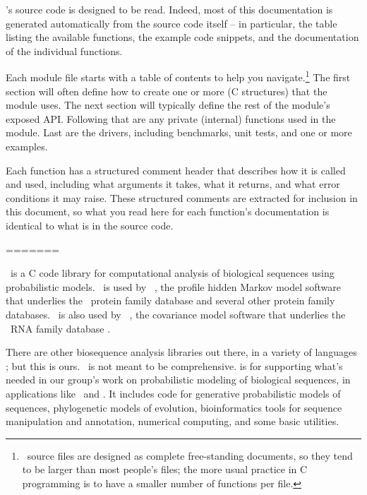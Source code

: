 \Easel's source code is designed to be read. Indeed, most of this
documentation is generated automatically from the source code itself
-- in particular, the table listing the available functions, the
example code snippets, and the documentation of the individual
functions.

Each module  file starts with a table of contents to help
you navigate.\footnote{\Easel\ source files are designed as complete
free-standing documents, so they tend to be larger than most people's
 files; the more usual practice in C programming is to have
a smaller number of functions per file.} The first section will often
define how to create one or more  (C structures) that
the module uses. The next section will typically define the rest of
the module's exposed API. Following that are any private (internal)
functions used in the module. Last are the drivers, including
benchmarks, unit tests, and one or more examples.

Each function has a structured comment header that describes how it is
called and used, including what arguments it takes, what it returns,
and what error conditions it may raise. These structured comments are
extracted for inclusion in this document, so what you read here for
each function's documentation is identical to what is in the source
code.



=======


\Easel\ is a C code library for computational analysis of biological
sequences using probabilistic models. \Easel\ is used by \HMMER\ 
\citep{hmmer,Eddy98}, the profile hidden Markov model software that
underlies the \Pfam\ protein family database
\citep{Finn06,Sonnhammer97} and several other protein family
databases. \Easel\ is also used by \Infernal\ 
\citep{infernal,NawrockiEddy07}, the covariance model software that
underlies the \Rfam\ RNA family database
\citep{Griffiths-Jones05}. 

There are other biosequence analysis libraries out there, in a variety
of languages
\citep{Vahrson96,Pitt01,Mangalam02,Butt05,Dutheil06,Giancarlo07,Doring08};
but this is ours.  \Easel\ is not meant to be comprehensive.  \Easel
is for supporting what's needed in our group's work on probabilistic
modeling of biological sequences, in applications like \HMMER\ and
\Infernal. It includes code for generative probabilistic models of
sequences, phylogenetic models of evolution, bioinformatics tools for
sequence manipulation and annotation, numerical computing, and some
basic utilities.

